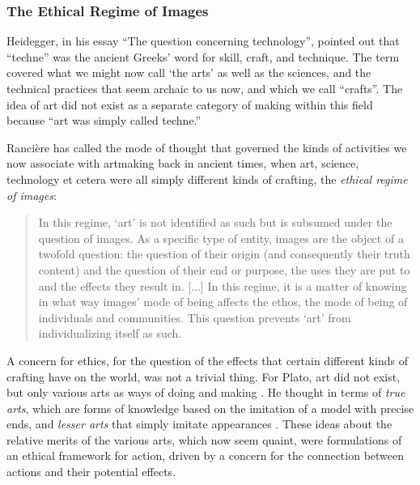 \documentclass[letter:wpaper]{article}
\begin{document}
    \subsubsection{The Ethical Regime of Images}

    Heidegger, in his essay “The question concerning technology”, pointed out that “techne” was the ancient Greeks' word for skill, craft, and technique. The term covered what we might now call ‘the arts’ as well as the sciences, and the technical practices that seem archaic to us now, and which we call “crafts”. The idea of art did not exist as a separate category of making within this field because “art was simply called techne.” \citep[p34]{HeideggerThQstnCncrngTchnlgy1954}
    
    Rancière has called the mode of thought that governed the kinds of activities we now associate with artmaking back in ancient times, when art, science, technology et cetera were all simply different kinds of crafting, the \emph{ethical regime of images}:

    \begin{quote}
        In this regime, ‘art’ is not identified as such but is subsumed under the question of images. As a specific type of entity, images are the object of a twofold question: the question of their origin (and consequently their truth content) and the question of their end or purpose, the uses they are put to and the effects they result in. [...] In this regime, it is a matter of knowing in what way images' mode of being affects the ethos, the mode of being of individuals and communities. This question prevents ‘art’ from individualizing itself as such. \citep[pp.20–21]{RancierPltcsOfThAsthtcs2004}
    \end{quote}

    A concern for ethics, for the question of the effects that certain different kinds of crafting have on the world, was not a trivial thing. For Plato, art did not exist, but only various arts as ways of doing and making \citep[p.20]{RancierPltcsOfThAsthtcs2004}. He thought in terms of \emph{true arts}, which are forms of knowledge based on the imitation of a model with precise ends, and \emph{lesser arts} that simply imitate appearances \citep[p.20]{RancierPltcsOfThAsthtcs2004}. These ideas about the relative merits of the various arts, which now seem quaint, were formulations of an ethical framework for action, driven by a concern for the connection between actions and their potential effects.
\end{document}

